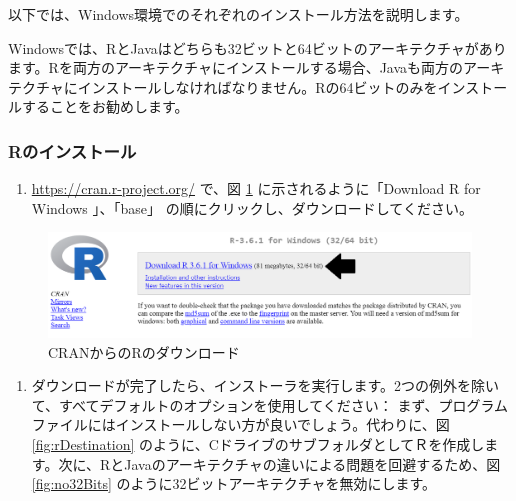 \documentclass[
  11pt]{book}
\makeatletter
\providecommand{\tightlist}{%
  \setlength{\itemsep}{0pt}\setlength{\parskip}{0pt}}
\newenvironment{kframe}{%
\medskip{}
\setlength{\fboxsep}{.8em}
 \def\at@end@of@kframe{}%
 \ifinner\ifhmode%
  \def\at@end@of@kframe{\end{minipage}}%
  \begin{minipage}{\columnwidth}%
 \fi\fi%
 \def\FrameCommand##1{\hskip\@totalleftmargin \hskip-\fboxsep
 \colorbox{myShadeColor}{##1}\hskip-\fboxsep
     \hskip-\linewidth \hskip-\@totalleftmargin \hskip\columnwidth}%
 \MakeFramed {\advance\hsize-\width
   \@totalleftmargin\z@ \linewidth\hsize
   \@setminipage}}%
 {\par\unskip\endMakeFramed%
 \at@end@of@kframe}
\newenvironment{rmdblock}[1]
  {
  \begin{itemize}
  \renewcommand{\labelitemi}{
    \raisebox{-.7\height}[0pt][0pt]{
      {\setkeys{Gin}{width=3em,keepaspectratio}\texttt{[image: images/\#1]}}
    }
  }
  \setlength{\fboxsep}{1em}
  \begin{kframe}
  \item
  }
  {
  \end{kframe}
  \end{itemize}
  }
\newenvironment{rmdimportant}
  {\begin{rmdblock}{important}}
  {\end{rmdblock}}
\theoremstyle{definition}
\theoremstyle{definition}
\theoremstyle{definition}
\theoremstyle{definition}
\theoremstyle{remark}
\makeatother
\begin{document}
以下では、Windows環境でのそれぞれのインストール方法を説明します。

\begin{rmdimportant}
Windowsでは、RとJavaはどちらも32ビットと64ビットのアーキテクチャがあります。Rを両方のアーキテクチャにインストールする場合、Javaも両方のアーキテクチャにインストールしなければなりません。Rの64ビットのみをインストールすることをお勧めします。
\end{rmdimportant}

\subsubsection*{Rのインストール}\label{rux306eux30a4ux30f3ux30b9ux30c8ux30fcux30eb}

\begin{enumerate}
\def\labelenumi{\arabic{enumi}.}
\tightlist
\item
  \url{https://cran.r-project.org/} で、図 \ref{fig:downloadR} に示されるように「Download R for Windows 」、「base」 の順にクリックし、ダウンロードしてください。
\end{enumerate}

\begin{figure}

{\centering \includegraphics[width=1\linewidth]{images/OhdsiAnalyticsTools/downloadR} 

}

\caption{CRANからのRのダウンロード}\label{fig:downloadR}
\end{figure}

\begin{enumerate}
\def\labelenumi{\arabic{enumi}.}
\setcounter{enumi}{1}
\tightlist
\item
  ダウンロードが完了したら、インストーラを実行します。2つの例外を除いて、すべてデフォルトのオプションを使用してください： まず、プログラムファイルにはインストールしない方が良いでしょう。代わりに、図 \ref{fig:rDestination} のように、CドライブのサブフォルダとしてＲを作成します。次に、RとJavaのアーキテクチャの違いによる問題を回避するため、図 \ref{fig:no32Bits} のように32ビットアーキテクチャを無効にします。
\end{enumerate}
\end{document}
